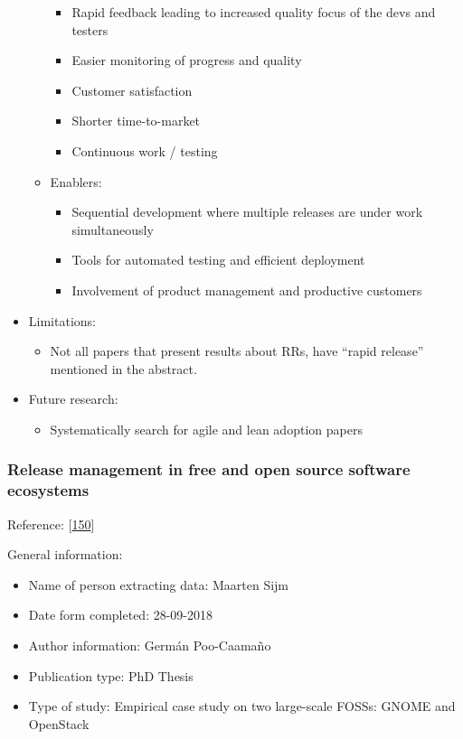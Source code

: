 \documentclass[]{book}
\providecommand{\tightlist}{%
  \setlength{\itemsep}{0pt}\setlength{\parskip}{0pt}}
\begin{document}
\begin{itemize}
\begin{itemize}
    \begin{itemize}
    \tightlist
    \item
      Rapid feedback leading to increased quality focus of the devs and
      testers
    \item
      Easier monitoring of progress and quality
    \item
      Customer satisfaction
    \item
      Shorter time-to-market
    \item
      Continuous work / testing
    \end{itemize}
  \item
    Enablers:

    \begin{itemize}
    \tightlist
    \item
      Sequential development where multiple releases are under work
      simultaneously
    \item
      Tools for automated testing and efficient deployment
    \item
      Involvement of product management and productive customers
    \end{itemize}
  \end{itemize}
\item
  Limitations:

  \begin{itemize}
  \tightlist
  \item
    Not all papers that present results about RRs, have ``rapid
    release'' mentioned in the abstract.
  \end{itemize}
\item
  Future research:

  \begin{itemize}
  \tightlist
  \item
    Systematically search for agile and lean adoption papers
  \end{itemize}
\end{itemize}

\subsubsection{Release management in free and open source software
ecosystems}\label{release-management-in-free-and-open-source-software-ecosystems}

Reference: {[}\protect\hyperlink{ref-poo-caamano2016a}{150}{]}

General information:

\begin{itemize}
\tightlist
\item
  Name of person extracting data: Maarten Sijm
\item
  Date form completed: 28-09-2018
\item
  Author information: Germán Poo-Caamaño
\item
  Publication type: PhD Thesis
\item
  Type of study: Empirical case study on two large-scale FOSSs: GNOME
  and OpenStack
\end{itemize}
\end{document}
